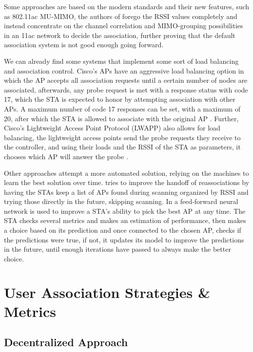 \documentclass{article}
\begin{document}
	Some approaches are based on the modern standards and their new features, such as 802.11ac MU-MIMO, the authors of \cite{mimo2017} forego the RSSI values completely and instead concentrate on the channel correlation and MIMO-grouping possibilities in an 11ac network to decide the association, further proving that the default association system is not good enough going forward.
	
We can already find some systems that implement some sort of load balancing and association control. Cisco's APs have an aggressive load balancing option in which the AP accepts all association requests until a certain number of nodes are associated, afterwards, any probe request is met with a response status with code 17, which the STA is expected to honor by attempting association with other APs. A maximum number of code 17 responses can be set, with a maximum of 20, after which the STA is allowed to associate with the original AP \cite{cisco2017}. Further, Cisco's Lightweight Access Point Protocol (LWAPP) also allows for load balancing, the lightweight access points send the probe requests they receive to the controller, and using their loads and the RSSI of the STA as parameters, it chooses which AP will answer the probe \cite{cisco2006}.

Other approaches attempt a more automated solution, relying on the machines to learn the best solution over time. \cite{shin2004} tries to improve the handoff of reassociations by having the STAs keep a list of APs found during scanning organized by RSSI and trying those directly in the future, skipping scanning.
In \cite{bojovic2011} a feed-forward neural network is used to improve a STA's ability to pick the best AP at any time. The STA checks several metrics and makes an estimation of performance, then makes a choice based on its prediction and once connected to the chosen AP, checks if the predictions were true, if not, it updates its model to improve the predictions in the future, until enough iterations have passed to always make the better choice.
	
	
	
	
\section{User Association Strategies \& Metrics}
\label{section:strategies}

	\subsection{Decentralized Approach}
	\label{section:decentralized}
	
\end{document}
